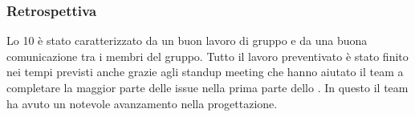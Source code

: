 \subsubsection{Retrospettiva}
\label{sec:retrospettiva_sprint10}
Lo  10 è stato caratterizzato da un buon lavoro di gruppo e da una buona comunicazione tra 
i membri del gruppo. Tutto il lavoro preventivato è stato finito nei tempi previsti anche grazie agli standup meeting 
che hanno aiutato il team a completare la maggior parte delle issue nella prima parte dello .
In questo  il team ha avuto un notevole avanzamento nella progettazione.